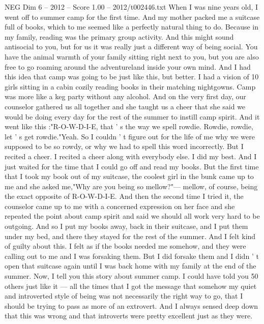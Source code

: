 \begin{textsample}{NEG Dim 6 – 2012 – Score 1.00 – 2012/t002446.txt}  \label{ex:f6_neg_038}
When I was nine years old, I went off to summer camp for the first time.
And my mother packed me a suitcase full of books, which to me seemed like a perfectly natural thing to do.
Because in my family, reading was the primary group activity.
And this might sound antisocial to you, but for us it was really just a different way of being social.
You have the animal warmth of your family sitting right next to you, but you are also free to go roaming around the adventureland inside your own mind.
And I had this idea that camp was going to be just like this, but better.
I had a vision of 10 girls sitting in a cabin cozily reading books in their matching nightgowns.
Camp was more like a keg party without any alcohol.
And on the very first day, our counselor gathered us all together and she taught us a cheer that she said we would be doing every day for the rest of the summer to instill camp spirit.
And it went like this :"R-O-W-D-I-E, that ' s the way we spell rowdie.
Rowdie, rowdie, let ' s get rowdie."Yeah.
So I couldn ' t figure out for the life of me why we were supposed to be so rowdy, or why we had to spell this word incorrectly.
But I recited a cheer.
I recited a cheer along with everybody else.
I did my best.
And I just waited for the time that I could go off and read my books.
But the first time that I took my book out of my suitcase, the coolest girl in the bunk came up to me and she asked me,"Why are you being so mellow?"— mellow, of course, being the exact opposite of R-O-W-D-I-E.
And then the second time I tried it, the counselor came up to me with a concerned expression on her face and she repeated the point about camp spirit and said we should all work very hard to be outgoing.
And so I put my books away, back in their suitcase, and I put them under my bed, and there they stayed for the rest of the summer.
And I felt kind of guilty about this.
I felt as if the books needed me somehow, and they were calling out to me and I was forsaking them.
But I did forsake them and I didn ' t open that suitcase again until I was back home with my family at the end of the summer.
Now, I tell you this story about summer camp.
I could have told you 50 others just like it — all the times that I got the message that somehow my quiet and introverted style of being was not necessarily the right way to go, that I should be trying to pass as more of an extrovert.
And I always sensed deep down that this was wrong and that introverts were pretty excellent just as they were.

\end{textsample}
